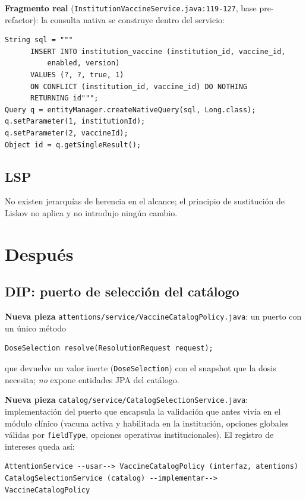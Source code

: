 \documentclass[11pt,a4paper]{article}
\begin{document}
\textbf{Fragmento real} (\texttt{InstitutionVaccineService.java:119-127}, base
pre-refactor): la consulta nativa se construye dentro del servicio:

\begin{lstlisting}
String sql = """
      INSERT INTO institution_vaccine (institution_id, vaccine_id,
          enabled, version)
      VALUES (?, ?, true, 1)
      ON CONFLICT (institution_id, vaccine_id) DO NOTHING
      RETURNING id""";
Query q = entityManager.createNativeQuery(sql, Long.class);
q.setParameter(1, institutionId);
q.setParameter(2, vaccineId);
Object id = q.getSingleResult();
\end{lstlisting}

\subsection{LSP}

No existen jerarquías de herencia en el alcance; el principio de sustitución de
Liskov no aplica y no introdujo ningún cambio.

\section{Después} \label{sec:despues}

\subsection{DIP: puerto de selección del catálogo}

\textbf{Nueva pieza} \texttt{attentions/service/VaccineCatalogPolicy.java}: un
puerto con un único método

\begin{lstlisting}
DoseSelection resolve(ResolutionRequest request);
\end{lstlisting}

que devuelve un valor inerte (\texttt{DoseSelection}) con el snapshot que la
dosis necesita; \emph{no} expone entidades JPA del catálogo.

\textbf{Nueva pieza} \texttt{catalog/service/CatalogSelectionService.java}:
implementación del puerto que encapsula la validación que antes vivía en el
módulo clínico (vacuna activa y habilitada en la institución, opciones globales
válidas por \texttt{fieldType}, opciones operativas institucionales). El registro
de intereses queda así:

\begin{lstlisting}
AttentionService --usar--> VaccineCatalogPolicy (interfaz, atentions)
CatalogSelectionService (catalog) --implementar--> VaccineCatalogPolicy
\end{lstlisting}
\end{document}
